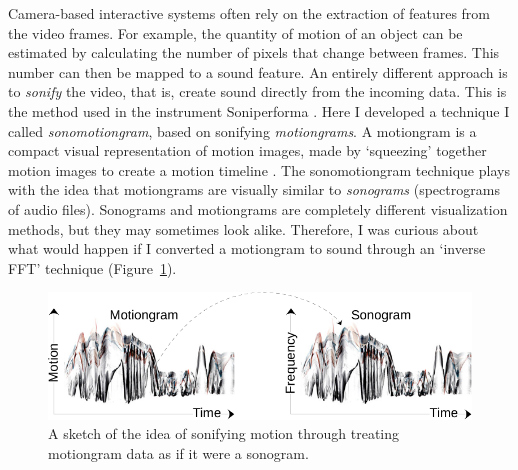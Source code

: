 Camera-based interactive systems often rely on the extraction of features from the video frames. For example, the quantity of motion of an object can be estimated by calculating the number of pixels that change between frames. This number can then be mapped to a sound feature. An entirely different approach is to \emph{sonify} the video, that is, create sound directly from the incoming data. This is the method used in the instrument Soniperforma \citep{jensenius_sonifying_2013}. Here I developed a technique I called \emph{sonomotiongram}, based on sonifying \emph{motiongrams}. A motiongram is a compact visual representation of motion images, made by `squeezing' together motion images to create a motion timeline \citep{jensenius_video_2013}. The sonomotiongram technique plays with the idea that motiongrams are visually similar to \emph{sonograms} (spectrograms of audio files). Sonograms and motiongrams are completely different visualization methods, but they may sometimes look alike. Therefore, I was curious about what would happen if I converted a motiongram to sound through an `inverse FFT' technique (Figure~\ref{fig:figures_time-frequency3}).

\begin{figure}[tbp]
	\centering
		\includegraphics[width=1\columnwidth]{figures/71-sonomotiongram-crop.pdf}
	\caption{A sketch of the idea of sonifying motion through treating motiongram data as if it were a sonogram.}
	\label{fig:figures_time-frequency3}
\end{figure}

